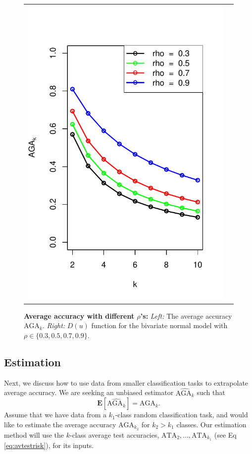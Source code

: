 \documentclass[twoside,11pt]{article}
\newcommand{\E}{\textbf{E}}
\begin{document}
\begin{figure}[p]
\begin{tabular}{cc}
\includegraphics[scale = 0.6, clip = true, trim = 0.0in 0 0.2in 0.6in]{illus_rhos_avrisk.pdf}
\end{tabular}

\caption{\textbf{Average accuracy with different $\rho$'s:}
\emph{Left:} The average accuracy $\text{AGA}_k$. \emph{Right:} ${D}(u)$ function for the bivariate normal model with $\rho \in \{0.3, 0.5, 0.7, 0.9\}$.
}\label{fig:toy4}
\end{figure}

\subsection{Estimation}\label{sec:extrapolation_estimation}

Next, we discuss how to use data from smaller classification tasks to
extrapolate average accuracy.
We are seeking an unbiased estimator $\widehat{\text{AGA}_k}$
such that %
\[
\E[\widehat{\text{AGA}_k}] = \text{AGA}_k.
\]
Assume that we have data from a
$k_1$-class random classification task, and would like to estimate the
average accuracy $\text{AGA}_{k_2}$ for $k_2>k_1$ classes.
Our estimation method will use the $k$-class average test accuracies,
$\text{ATA}_2,...,\text{ATA}_{k_1}$ (see Eq \ref{eq:avtestrisk}), for
its inputs.
\end{document}
